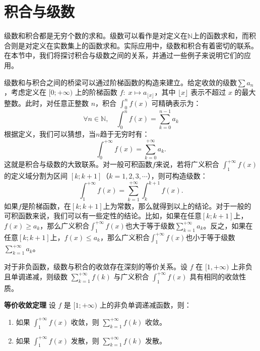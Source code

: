 \documentclass[12pt,UTF8,fontset=none]{ctexbook}
\begin{document}
\section{积合与级数}

级数和积合都是无穷个数的求和。级数可以看作是对定义在$\mathbb{N}$上的函数求和，而积合则是对定义在实数集上的函数求和。实际应用中，级数和积合有着密切的联系。在本节中，我们将探讨积合与级数之间的关系，并通过一些例子来说明它们的应用。

级数和与积合之间的桥梁可以通过阶梯函数的构造来建立。给定收敛的级数$\sum a_n$，考虑定义在 $[0;+\infty)$ 上的阶梯函数 $f:\; x\mapsto a_{\lfloor x \rfloor}$，其中 $\lfloor x \rfloor$ 表示不超过 $x$ 的最大整数。此时，对任意正整数 $n$，积合 $\int_0^{n} f(x) $ 可精确表示为：
\[
\forall n \in \mathbb{N},\quad
\int_0^{n} f(x) = \sum_{k=0}^{n-1} a_k
\]
根据定义，我们可以猜想，当$n$趋于无穷时有：
\[
\int_0^{+\infty} f(x) = \sum_{k=0}^{+\infty} a_k.
\]
这就是积合与级数的大致联系。对一般可积函数$f$来说，若将广义积合 $\int_1^{+\infty} f(x)$的定义域分割为区间 $[k; k+1]$（$k=1,2,3,\cdots$），则可构造级数：
\[
\int_1^{+\infty} f(x) = \sum_{k=1}^{+\infty} \int_k^{k+1} f(x).
\]
如果$f$是阶梯函数，在$[k;k+1]$上为常数，那么就得到以上的结论。对于一般的可积函数来说，我们可以有一些定性的结论。比如，如果在任意$[k;k+1]$上，$f(x) \geqslant a_k$，那么广义积合$\int_1^{+\infty} f(x)$也大于等于级数$\displaystyle\sum_{k=1}^{+\infty} a_k$。反之，如果在任意$[k;k+1]$上，$f(x) \leqslant a_k$，那么广义积合$\int_1^{+\infty} f(x)$也小于等于级数$\displaystyle\sum_{k=1}^{+\infty} a_k$。

对于非负函数，级数与积合的收敛存在深刻的等价关系。设 $f$ 在 $[1,+\infty)$ 上非负且单调递减，则级数 $\sum_{k=1}^{+\infty} f(k)$ 与广义积合 $\int_{1}^{+\infty} f(x)$ 具有相同的收敛性质。

\begin{tm}{\textbf{等价收敛定理}}
    设 $f$ 是 $[1;+\infty)$ 上的非负单调递减函数，则：
    \begin{enumerate}
        \item 如果 $\displaystyle\int_{1}^{+\infty} f(x)$ 收敛，则 $\displaystyle\sum_{k=1}^{+\infty} f(k)$ 收敛。
        \item 如果 $\displaystyle\int_{1}^{+\infty} f(x)$ 发散，则 $\displaystyle\sum_{k=1}^{+\infty} f(k)$ 发散。
    \end{enumerate}
    
\end{tm}
\end{document}
